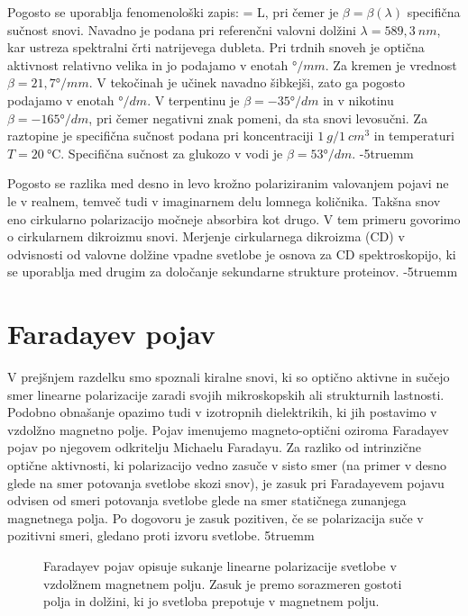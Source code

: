 Pogosto se uporablja fenomenološki zapis:
\beq
\Delta \varphi = \beta L,
\label{eq:09_50}
\eeq
pri čemer je $\beta = \beta (\lambda)$ specifična sučnost snovi. Navadno je podana pri referenčni
valovni dolžini $\lambda = 589,3~\si{nm}$, kar ustreza spektralni črti natrijevega dubleta. Pri 
trdnih snoveh je optična aktivnost relativno velika in jo podajamo v enotah $\si{\degree}/\si{mm}$. Za 
kremen je vrednost $\beta = 21,7\si{\degree}/\si{mm}$. V tekočinah je učinek
navadno šibkejši, zato ga pogosto podajamo v enotah $\si{\degree}/\si{dm}$. V terpentinu
je $\beta = -35\si{\degree}/\si{dm}$ in v nikotinu $\beta = -165\si{\degree}/\si{dm}$,
pri čemer negativni znak pomeni, da sta snovi levosučni. Za raztopine je specifična sučnost
podana pri koncentraciji $1~\si{g}/1~\si{cm}^3$ in temperaturi $T = 20~\si{\celsius}$. 
Specifična sučnost za glukozo v vodi je $\beta = 53\si{\degree}/\si{dm}$.
\vglue-5truemm
\begin{remark}
Pogosto se razlika med desno in levo krožno polariziranim valovanjem pojavi ne le v realnem, 
temveč tudi v imaginarnem delu lomnega količnika. Takšna snov eno cirkularno polarizacijo močneje
absorbira kot drugo. V tem primeru govorimo o cirkularnem dikroizmu snovi. Merjenje cirkularnega
dikroizma (CD) v odvisnosti od valovne dolžine vpadne svetlobe je osnova za CD spektroskopijo, ki
se uporablja med drugim za določanje sekundarne strukture proteinov. 
\vglue-5truemm
\end{remark}

\section{Faradayev pojav}
V prejšnjem razdelku smo spoznali kiralne snovi, ki so optično aktivne in sučejo smer
linearne polarizacije zaradi svojih mikroskopskih ali strukturnih lastnosti. 
Podobno obnašanje opazimo tudi v izotropnih dielektrikih, ki jih postavimo v vzdolžno
magnetno polje. Pojav imenujemo magneto-optični oziroma Faradayev pojav
po njegovem odkritelju Michaelu Faradayu. Za razliko 
od intrinzične optične aktivnosti, ki polarizacijo vedno zasuče v sisto smer (na primer
v desno glede na smer potovanja svetlobe skozi snov), je zasuk pri Faradayevem pojavu 
odvisen od smeri potovanja svetlobe glede na smer statičnega zunanjega 
magnetnega polja. Po dogovoru je zasuk pozitiven, če se polarizacija suče v 
pozitivni smeri, gledano proti izvoru svetlobe.
\vglue5truemm
\begin{figure}[h]
\centering
\def\svgwidth{120truemm} 

\caption{Faradayev pojav opisuje sukanje linearne polarizacije svetlobe v vzdolžnem mag\-net\-nem
polju. Zasuk je premo sorazmeren gostoti polja in dolžini, ki jo svetloba prepotuje
v magnetnem polju.}
\label{fig:09_Faraday}
\end{figure}

